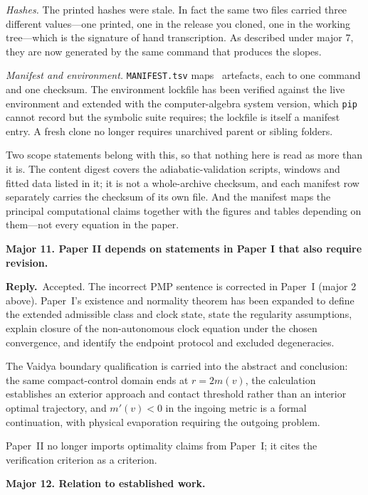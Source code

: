 \documentclass[11pt]{article}
\newcommand{\reply}{\par\noindent\textbf{Reply.}\ }
\newcommand{\R}[1]{\par\medskip\noindent\textbf{#1}\par\nopagebreak}
\begin{document}
\emph{Hashes.} The printed hashes were stale. In fact the same two files carried
three different values---one printed, one in the release you cloned, one in the
working tree---which is the signature of hand transcription. As described under
major 7, they are now generated by the same command that produces the slopes.

\emph{Manifest and environment.} \texttt{MANIFEST.tsv} maps \ManifestArtefacts\ artefacts,
each to one command and one checksum. The environment lockfile has been verified
against the live environment and extended with the computer-algebra system
version, which \texttt{pip} cannot record but the symbolic suite requires; the
lockfile is itself a manifest entry. A fresh clone no longer requires unarchived
parent or sibling folders.

Two scope statements belong with this, so that nothing here is read as more than it
is. The content digest covers the adiabatic-validation scripts, windows and fitted
data listed in it; it is not a whole-archive checksum, and each manifest row
separately carries the checksum of its own file. And the manifest maps the principal
computational claims together with the figures and tables depending on them---not
every equation in the paper.

\R{Major 11. Paper II depends on statements in Paper I that also require revision.}

\reply Accepted. The incorrect PMP sentence is corrected in Paper~I (major 2
above). Paper~I's existence and normality theorem has been expanded to define the
extended admissible class and clock state, state the regularity assumptions,
explain closure of the non-autonomous clock equation under the chosen
convergence, and identify the endpoint protocol and excluded degeneracies.

The Vaidya boundary qualification is carried into the abstract and conclusion:
the same compact-control domain ends at $r=2m(v)$, the calculation establishes an
exterior approach and contact threshold rather than an interior optimal
trajectory, and $m'(v)<0$ in the ingoing metric is a formal continuation, with
physical evaporation requiring the outgoing problem.

Paper~II no longer imports optimality claims from Paper~I; it cites the
verification criterion as a criterion.

\R{Major 12. Relation to established work.}
\end{document}
